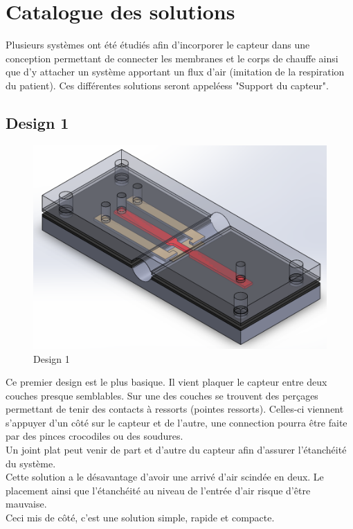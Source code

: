 \section{Catalogue des solutions}
Plusieurs systèmes ont été étudiés afin d'incorporer le capteur dans une conception permettant de connecter les membranes et le corps de chauffe
ainsi que d'y attacher un système apportant un flux d'air (imitation de la respiration du patient). Ces différentes solutions seront appeléess
"Support du capteur".

\subsection{Design 1}
\begin{figure}[H]
    \centering
    \includegraphics[scale = 0.3]{images/Design1.png}
    \caption{Design 1}
    \label{fig:design1}
\end{figure}
Ce premier design est le plus basique. Il vient plaquer le capteur entre deux couches presque semblables. Sur une des couches se trouvent des
perçages permettant de tenir des contacts à ressorts (pointes ressorts). Celles-ci viennent s'appuyer d'un côté sur le capteur et
de l'autre, une  connection pourra être faite par des pinces crocodiles ou des soudures. \\
Un joint plat peut venir de part et d'autre du capteur afin d'assurer l'étanchéité du système.\\
Cette solution a le désavantage d'avoir une arrivé d'air scindée en deux. Le placement ainsi que l'étanchéité au niveau de l'entrée
d'air risque d'être mauvaise. \\
Ceci mis de côté, c'est une solution simple, rapide et compacte.

